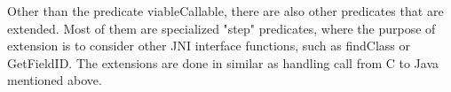 Other than the predicate viableCallable, there are also other predicates that
are extended. Most of them are specialized "step" predicates, where the purpose
of extension is to consider other JNI interface functions, such as
findClass or GetFieldID. The extensions are done in similar as handling
call from C to Java mentioned above.
